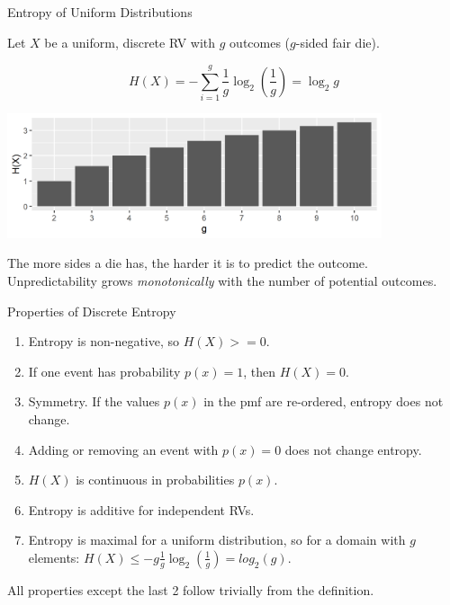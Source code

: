 \documentclass[11pt,compress,t,notes=noshow, xcolor=table]{beamer}
\begin{document}
\begin{vbframe}{Entropy of Uniform Distributions}

Let $X$ be a uniform, discrete RV with $g$ outcomes ($g$-sided fair die).

$$H(X) = - \sum_{i=1}^g \frac{1}{g} \log_2 \left(\frac{1}{g}\right) = \log_2 g$$

\vspace{0.2cm}
\begin{center}
\includegraphics[width = 11cm ]{figure/entropy_uniform_plot.png} \\
\end{center}

The more sides a die has, the harder it is to predict the outcome. 
Unpredictability grows \textit{monotonically} with the number of potential outcomes.
\end{vbframe}

\begin{vbframe}{Properties of Discrete Entropy}
  \begin{enumerate}
    \item Entropy is non-negative, so $H(X) >= 0$.
    \item If one event has probability $p(x) = 1$, then $H(X)=0$. 
    \item Symmetry. If the values $p(x)$ in the pmf are re-ordered, entropy does not change.
    \item Adding or removing an event with $p(x)=0$ does not change entropy.
    \item $H(X)$ is continuous in probabilities $p(x)$.
    \item Entropy is additive for independent RVs.
    \item Entropy is maximal for a uniform distribution, so for a domain with $g$ elements:  
      $H(X) \leq -g\frac{1}{g} \log_2(\frac{1}{g}) = log_2(g)$.
  \end{enumerate}
\lz
All properties except the last 2 follow trivially from the definition.
\end{vbframe}
\end{document}
